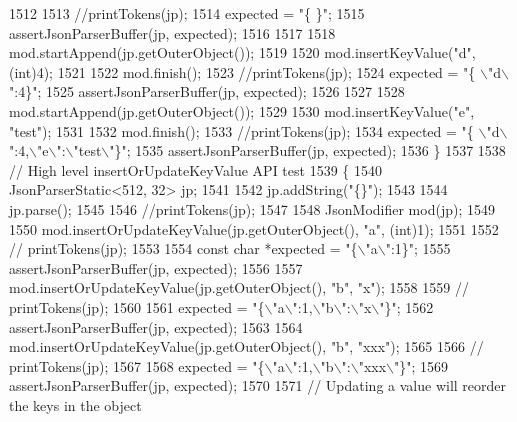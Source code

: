 \begin{DoxyCode}
{{{{{{{{{{{{{{{{{{{{{1512 
1513         \textcolor{comment}{//printTokens(jp);}
1514         expected = \textcolor{stringliteral}{"\{   \}"};
1515         assertJsonParserBuffer(jp, expected);
1516 
1517 
1518         mod.startAppend(jp.getOuterObject());
1519 
1520         mod.insertKeyValue(\textcolor{stringliteral}{"d"}, (\textcolor{keywordtype}{int})4);
1521 
1522         mod.finish();
1523         \textcolor{comment}{//printTokens(jp);}
1524         expected = \textcolor{stringliteral}{"\{   \(\backslash\)"d\(\backslash\)":4\}"};
1525         assertJsonParserBuffer(jp, expected);
1526 
1527 
1528         mod.startAppend(jp.getOuterObject());
1529 
1530         mod.insertKeyValue(\textcolor{stringliteral}{"e"}, \textcolor{stringliteral}{"test"});
1531 
1532         mod.finish();
1533         \textcolor{comment}{//printTokens(jp);}
1534         expected = \textcolor{stringliteral}{"\{   \(\backslash\)"d\(\backslash\)":4,\(\backslash\)"e\(\backslash\)":\(\backslash\)"test\(\backslash\)"\}"};
1535         assertJsonParserBuffer(jp, expected);
1536     \}
1537 
1538     \textcolor{comment}{// High level insertOrUpdateKeyValue API test}
1539     \{
1540         JsonParserStatic<512, 32> jp;
1541 
1542         jp.addString(\textcolor{stringliteral}{"\{\}"});
1543 
1544         jp.parse();
1545 
1546         \textcolor{comment}{//printTokens(jp);}
1547 
1548         JsonModifier mod(jp);
1549 
1550         mod.insertOrUpdateKeyValue(jp.getOuterObject(), \textcolor{stringliteral}{"a"}, (int)1);
1551 
1552         \textcolor{comment}{// printTokens(jp);}
1553 
1554         \textcolor{keyword}{const} \textcolor{keywordtype}{char} *expected = \textcolor{stringliteral}{"\{\(\backslash\)"a\(\backslash\)":1\}"};
1555         assertJsonParserBuffer(jp, expected);
1556 
1557         mod.insertOrUpdateKeyValue(jp.getOuterObject(), \textcolor{stringliteral}{"b"}, \textcolor{stringliteral}{"x"});
1558 
1559         \textcolor{comment}{// printTokens(jp);}
1560 
1561         expected = \textcolor{stringliteral}{"\{\(\backslash\)"a\(\backslash\)":1,\(\backslash\)"b\(\backslash\)":\(\backslash\)"x\(\backslash\)"\}"};
1562         assertJsonParserBuffer(jp, expected);
1563 
1564         mod.insertOrUpdateKeyValue(jp.getOuterObject(), \textcolor{stringliteral}{"b"}, \textcolor{stringliteral}{"xxx"});
1565 
1566         \textcolor{comment}{// printTokens(jp);}
1567 
1568         expected = \textcolor{stringliteral}{"\{\(\backslash\)"a\(\backslash\)":1,\(\backslash\)"b\(\backslash\)":\(\backslash\)"xxx\(\backslash\)"\}"};
1569         assertJsonParserBuffer(jp, expected);
1570 
1571         \textcolor{comment}{// Updating a value will reorder the keys in the object}
}}}}}}}}}}}}}}}}}}}}}
\end{DoxyCode}
